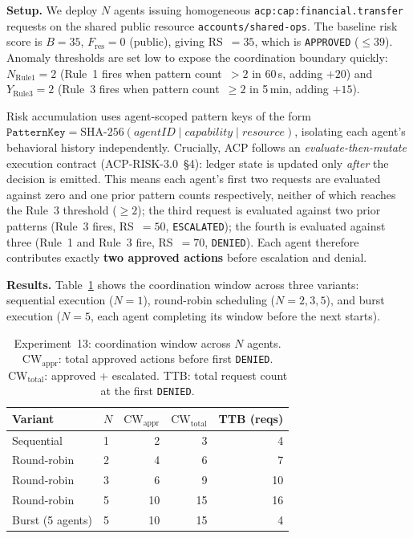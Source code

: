 \documentclass[11pt]{article}
\theoremstyle{definition}
\begin{document}
\textbf{Setup.}
We deploy $N$ agents issuing homogeneous
\texttt{acp:cap:financial.transfer} requests on the shared public resource
\texttt{accounts/shared-ops}.
The baseline risk score is $B=35$, $F_\text{res}=0$ (public),
giving RS~$= 35$, which is \texttt{APPROVED} ($\leq 39$).
Anomaly thresholds are set low to expose the coordination boundary quickly:
$N_{\mathrm{Rule1}}=2$ (Rule~1 fires when pattern count~$> 2$ in 60\,s,
adding $+20$) and $Y_{\mathrm{Rule3}}=2$ (Rule~3 fires when pattern
count~$\geq 2$ in 5\,min, adding $+15$).

Risk accumulation uses agent-scoped pattern keys of the form
$\mathtt{PatternKey} = \mathrm{SHA\text{-}256}(\mathit{agentID} \mid
\mathit{capability} \mid \mathit{resource})$, isolating each agent's
behavioral history independently.
Crucially, ACP follows an \emph{evaluate-then-mutate} execution contract
(ACP-RISK-3.0~\S4): ledger state is updated only \emph{after} the decision
is emitted.
This means each agent's first two requests are evaluated against zero and one
prior pattern counts respectively, neither of which reaches the Rule~3
threshold ($\geq 2$); the third request is evaluated against two prior
patterns (Rule~3 fires, RS~$=50$, \texttt{ESCALATED}); the fourth is
evaluated against three (Rule~1 and Rule~3 fire, RS~$=70$, \texttt{DENIED}).
Each agent therefore contributes exactly \textbf{two approved actions} before
escalation and denial.

\textbf{Results.}
Table~\ref{tab:exp13} shows the coordination window across three variants:
sequential execution ($N=1$), round-robin scheduling ($N=2,3,5$), and burst
execution ($N=5$, each agent completing its window before the next starts).

\begin{table}[h]
\centering
\small
\begin{tabular}{@{}llrrr@{}}
\toprule
Variant & $N$ & $\mathrm{CW}_\mathrm{appr}$ & $\mathrm{CW}_\mathrm{total}$ & TTB (reqs) \\
\midrule
Sequential          & 1 & 2  &  3 &  4 \\
Round-robin         & 2 & 4  &  6 &  7 \\
Round-robin         & 3 & 6  &  9 & 10 \\
Round-robin         & 5 & 10 & 15 & 16 \\
Burst (5 agents)    & 5 & 10 & 15 &  4 \\
\bottomrule
\end{tabular}
\caption{Experiment~13: coordination window across $N$ agents.
$\mathrm{CW}_\mathrm{appr}$: total approved actions before first
\texttt{DENIED}. $\mathrm{CW}_\mathrm{total}$: approved + escalated.
TTB: total request count at the first \texttt{DENIED}.}
\label{tab:exp13}
\end{table}
\end{document}
